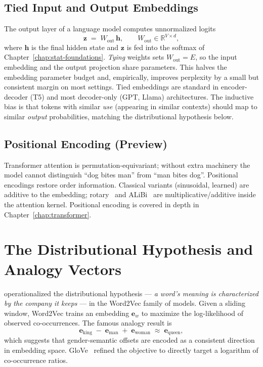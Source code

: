 \subsection{Tied Input and Output Embeddings}

The output layer of a language model computes unnormalized logits
\begin{equation}
\label{eq:ch4-unembed}
\mathbf{z} \;=\; W_{\mathrm{out}}\,\mathbf{h},
\qquad
W_{\mathrm{out}} \in \mathbb{R}^{V \times d},
\end{equation}
where $\mathbf{h}$ is the final hidden state and $\mathbf{z}$ is fed
into the softmax of Chapter~\ref{chap:stat-foundations}. \emph{Tying} weights sets
$W_{\mathrm{out}} = E$, so the input embedding and the output projection
share parameters. This halves the embedding parameter budget and,
empirically, improves perplexity by a small but consistent margin on
most settings. Tied embeddings are standard in encoder-decoder (T5) and
most decoder-only (GPT, Llama) architectures. The inductive bias is
that tokens with similar \emph{use} (appearing in similar contexts)
should map to similar \emph{output} probabilities, matching the
distributional hypothesis below.

\subsection{Positional Encoding (Preview)}

Transformer attention is permutation-equivariant; without extra
machinery the model cannot distinguish ``dog bites man'' from
``man bites dog''. Positional encodings restore order information.
Classical variants (sinusoidal, learned) are additive to the embedding;
rotary~\citep{su2021rope} and ALiBi~\citep{press2022alibi} are
multiplicative/additive inside the attention kernel. Positional
encoding is covered in depth in Chapter~\ref{chap:transformer}.

\section{The Distributional Hypothesis and Analogy Vectors}

\citet{mikolov2013efficient,mikolov2013distributed} operationalized the
distributional hypothesis — \emph{a word's meaning is characterized by
the company it keeps} — in the Word2Vec family of models. Given a
sliding window, Word2Vec trains an embedding $\mathbf{e}_w$ to
maximize the log-likelihood of observed co-occurrences. The
famous analogy result is
\begin{equation}
\mathbf{e}_{\text{king}} \;-\; \mathbf{e}_{\text{man}}
\;+\; \mathbf{e}_{\text{woman}}
\;\approx\; \mathbf{e}_{\text{queen}},
\end{equation}
which suggests that gender-semantic offsets are encoded as a
consistent direction in embedding space. GloVe~\citep{pennington2014glove}
refined the objective to directly target a logarithm of co-occurrence
ratios.

